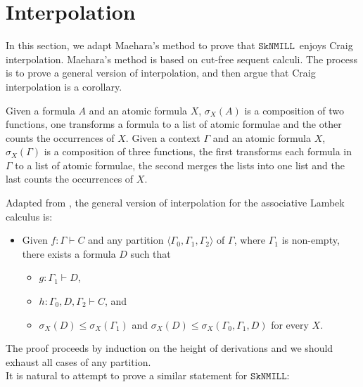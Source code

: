 \documentclass[sn-mathphys-num]{sn-jnl}%
\newcommand{\GG}{\Gamma}
\newcommand{\SkNMILL}{$\mathtt{SkNMILL}$}
\newcommand{\gs}[1]{\sigma_{X} (#1)}
\theoremstyle{thmstyleone}%
\theoremstyle{thmstyletwo}%
\theoremstyle{thmstylethree}%
\begin{document}
\section{Interpolation}
In this section, we adapt Maehara's method to prove that \SkNMILL~enjoys Craig interpolation.
Maehara's method is based on cut-free sequent calculi.
The process is to prove a general version of interpolation, and then argue that Craig interpolation is a corollary.

Given a formula $A$ and an atomic formula $X$, $\gs{A}$ is a composition of two functions, one transforms a formula to a list of atomic formulae and the other counts the occurrences of $X$.
Given a context $\GG$ and an atomic formula $X$, $\gs{\GG}$ is a composition of three functions, the first transforms each formula in $\GG$ to a list of atomic formulae, the second merges the lists into one list and the last counts the occurrences of $X$.

Adapted from \cite[Chapter 2.10]{moot:categorial:2012}, the general version of interpolation for the associative Lambek calculus is:
\begin{itemize}
  \item[\ ] Given $f : \Gamma \vdash C$ and any partition $\langle \Gamma_0, \Gamma_1, \Gamma_2 \rangle$ of $\Gamma$, where $\GG_1$ is non-empty, there exists a formula $D$ such that
  \begin{itemize}
    \item[--] $g : \Gamma_1 \vdash D$,
    \item[--] $h : \Gamma_0, D, \Gamma_2 \vdash C$, and 
    \item[--] $\gs{D} \leq \gs{\GG_1}$ and  $\gs{D} \leq \gs{\GG_0 , \GG_1 , D}$ for every $X$.
  \end{itemize}
\end{itemize}
The proof proceeds by induction on the height of derivations and we should exhaust all cases of any partition.
\\
It is natural to attempt to prove a similar statement for \SkNMILL:
\end{document}
